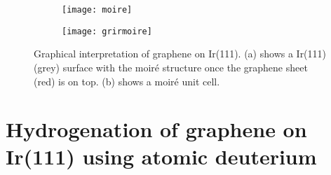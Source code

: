 \begin{figure}[H]
  \centering
  \begin{subfigure}[b]{0.4\textwidth}
       \texttt{[image: moire]}
       \caption{}
       \label{moire}
   \end{subfigure}
   \begin{subfigure}[b]{0.4\textwidth}
        \texttt{[image: grirmoire]}
        \caption{}
        \label{grirmoire}
    \end{subfigure}
  \caption{Graphical interpretation of graphene on Ir(111). (a) shows a Ir(111) (grey) surface with the moiré structure once the graphene sheet (red) is on top. (b) shows a moiré unit cell. \cite{Line}}
  \label{moireunitcell}
\end{figure}


\section{Hydrogenation of graphene on Ir(111) using atomic deuterium}

